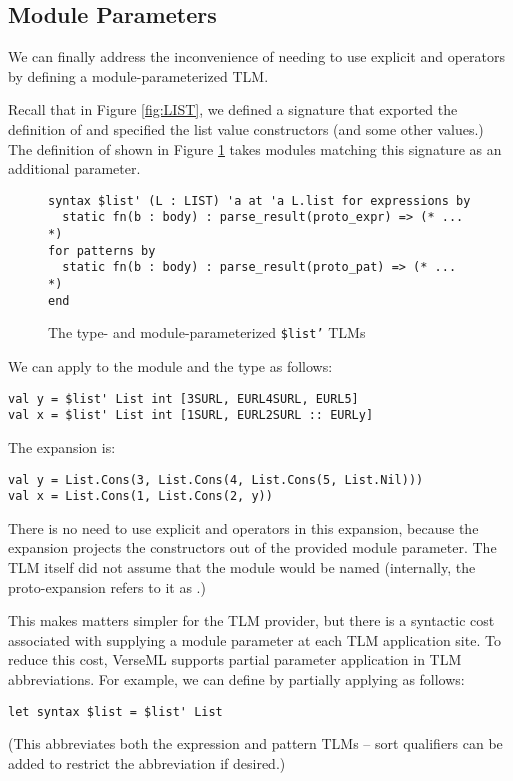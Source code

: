 \subsection{Module Parameters}\label{sec:module-parameters}
We can finally address the inconvenience of needing to use explicit  and   operators by  defining a module-parameterized TLM.

Recall that in Figure \ref{fig:LIST}, we defined a signature  that exported the definition of  and specified the list value constructors (and some other values.) The definition of  shown in Figure \ref{fig:ptsm-listprime} takes modules matching this signature as an additional parameter.

\begin{figure}[h]
\begin{lstlisting}[numbers=none]
syntax $list' (L : LIST) 'a at 'a L.list for expressions by 
  static fn(b : body) : parse_result(proto_expr) => (* ... *)
for patterns by 
  static fn(b : body) : parse_result(proto_pat) => (* ... *)
end
\end{lstlisting}
\caption{The type- and module-parameterized \texttt{\$list'} TLMs}
\label{fig:ptsm-listprime}
\end{figure}

We can apply  to the module  and the type  as follows:
\begin{lstlisting}[numbers=none]
val y = $list' List int [3SURL, EURL4SURL, EURL5]
val x = $list' List int [1SURL, EURL2SURL :: EURLy]
\end{lstlisting}
The expansion is:
\begin{lstlisting}[numbers=none]
val y = List.Cons(3, List.Cons(4, List.Cons(5, List.Nil)))
val x = List.Cons(1, List.Cons(2, y))
\end{lstlisting}
There is no need to use explicit  and  operators in this expansion, because the expansion projects the constructors out of the provided module parameter. The TLM itself did not assume that the module would be named  (internally, the proto-expansion refers to it as .)

This makes matters simpler for the TLM provider, but there is a syntactic cost associated with supplying a module parameter at each TLM application site. To reduce this cost, VerseML supports partial parameter application in TLM abbreviations. For example, we can define  by partially applying  as follows:
\begin{lstlisting}[numbers=none]
let syntax $list = $list' List
\end{lstlisting}
(This abbreviates both the expression and pattern TLMs -- sort qualifiers can be added to restrict the abbreviation if desired.)


